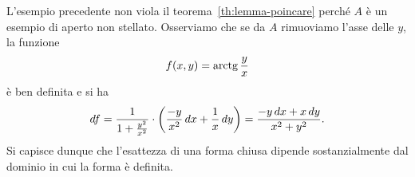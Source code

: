 L'esempio precedente non viola il teorema~\ref{th:lemma-poincare}
perché $A$ è un esempio di aperto non stellato.
Osserviamo che se da $A$ rimuoviamo l'asse delle $y$,
la funzione 
\[
  f(x,y) = \operatorname{arctg} \frac{y}{x}
\]
è ben definita e si ha
\[
df = \frac{1}{1+ \frac{y^2}{x^2}}\cdot 
    {\left( \frac{-y}{x^2}\, dx + \frac{1}{x}\, dy \right)}
    = \frac{-y\, dx + x\, dy}{x^2+y^2}.
\]
Si capisce dunque che l'esattezza di una forma chiusa dipende sostanzialmente 
dal dominio in cui la forma è definita.

